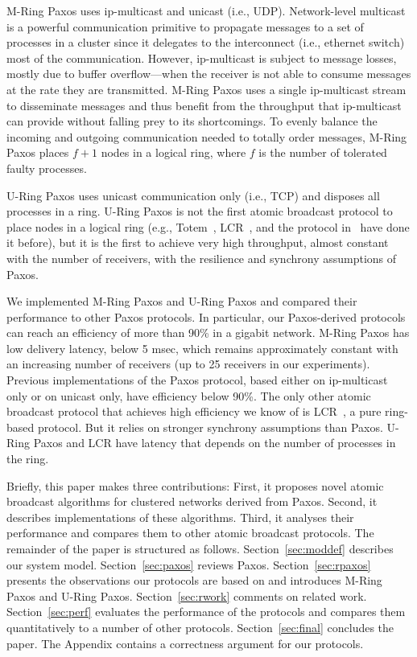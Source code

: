 \documentclass[final,3p,times,twocolumn,authoryear]{elsarticle}
\begin{document}
M-Ring Paxos uses ip-multicast and unicast (i.e., UDP). Network-level multicast is a powerful communication primitive to propagate messages to a set of processes in a cluster since it delegates to the interconnect (i.e., ethernet switch) most of the communication. 
However, ip-multicast is subject to message losses, mostly due to buffer overflow---when the receiver is not able to consume messages at the rate they are transmitted. 
M-Ring Paxos uses a single ip-multicast stream to disseminate messages and thus benefit from the throughput that ip-multicast can provide without falling prey to its shortcomings. To evenly balance the incoming and outgoing communication needed to totally order messages, M-Ring Paxos places $f+1$ nodes in a logical ring, where $f$ is the number of tolerated faulty processes.

U-Ring Paxos uses unicast communication only (i.e., TCP) and disposes all processes in a ring. U-Ring Paxos is not the first atomic broadcast protocol to place nodes in a logical ring (e.g., Totem~\cite{amir1995totem}, LCR~\cite{Guerraoui2010}, and the protocol in~\cite{ESU04} have done it before), but it is the first to achieve very high throughput, almost constant with the number of receivers, with the resilience and synchrony assumptions of Paxos.

We implemented M-Ring Paxos and U-Ring Paxos and compared their performance to other Paxos protocols. 
In particular, our Paxos-derived protocols can reach an efficiency of more than 90\% in a gigabit network. 
M-Ring Paxos has low delivery latency, below 5 msec, which remains approximately constant with an increasing number of receivers (up to 25 receivers in our experiments).
Previous implementations of the Paxos protocol, based either on ip-multicast only or on unicast only, have efficiency below 90\%. 
The only other atomic broadcast protocol that achieves high efficiency we know of is LCR~\cite{Guerraoui2010}, a pure ring-based protocol. 
But it relies on stronger synchrony assumptions than Paxos. 
U-Ring Paxos and LCR have latency that depends on the number of processes in the ring.

Briefly, this paper makes three contributions: 
First, it proposes novel atomic broadcast algorithms for clustered networks derived from Paxos. 
Second, it describes implementations of these algorithms. 
Third, it analyses their performance and compares them to other atomic broadcast protocols.
The remainder of the paper is structured as follows.
Section~\ref{sec:moddef} describes our system model.
Section~\ref{sec:paxos} reviews Paxos.
Section~\ref{sec:rpaxos} presents the observations our protocols are based on and introduces
M-Ring Paxos and U-Ring Paxos.
Section~\ref{sec:rwork} comments on related work.
Section~\ref{sec:perf} evaluates the performance of the protocols and
compares them quantitatively to a number of other protocols.
Section~\ref{sec:final} concludes the paper.
The Appendix contains a correctness argument for our protocols.
\end{document}
